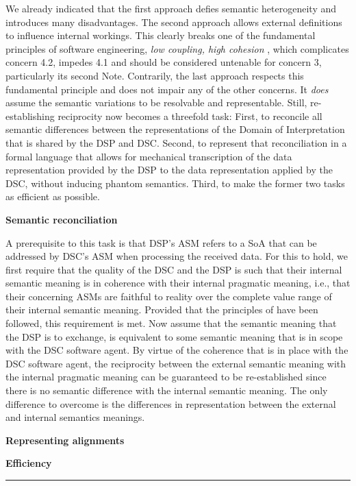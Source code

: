 \documentclass[sort&compress,preprint,authoryear,3p,twocolumn]{elsarticle}
\begin{document}
We already indicated that the first approach defies semantic
heterogeneity and introduces many disadvantages. The second approach
allows external definitions to influence internal workings. This clearly
breaks one of the fundamental principles of software engineering,
\emph{low coupling, high cohesion} \citep[e.g.,][]{Hitz1995}, which
complicates concern 4.2, impedes 4.1 and should be considered untenable
for concern 3, particularly its second Note. Contrarily, the last
approach respects this fundamental principle and does not impair any of
the other concerns. It \emph{does} assume the semantic variations to be
resolvable and representable. Still, re-establishing reciprocity now
becomes a threefold task: First, to reconcile all semantic differences
between the representations of the Domain of Interpretation that is
shared by the DSP and DSC. Second, to represent that reconciliation in a
formal language that allows for mechanical transcription of the data
representation provided by the DSP to the data representation applied by
the DSC, without inducing phantom semantics. Third, to make the former
two tasks as efficient as possible.

\textbf{Semantic reconciliation}

A prerequisite to this task is that DSP's ASM refers to a SoA that can
be addressed by DSC's ASM when processing the received data. For this to
hold, we first require that the quality of the DSC and the DSP is such
that their internal semantic meaning is in coherence with their internal
pragmatic meaning, i.e., that their concerning ASMs are faithful to
reality over the complete value range of their internal semantic
meaning. Provided that the principles of \citep{Brandt2021a} have been
followed, this requirement is met. Now assume that the semantic meaning
that the DSP is to exchange, is equivalent to some semantic meaning that
is in scope with the DSC software agent. By virtue of the coherence that
is in place with the DSC software agent, the reciprocity between the
external semantic meaning with the internal pragmatic meaning can be
guaranteed to be re-established since there is no semantic difference
with the internal semantic meaning. The only difference to overcome is
the differences in representation between the external and internal
semantics meanings.

\textbf{Representing alignments}

\textbf{Efficiency}

\begin{center}\rule{0.5\linewidth}{0.5pt}\end{center}
\end{document}
